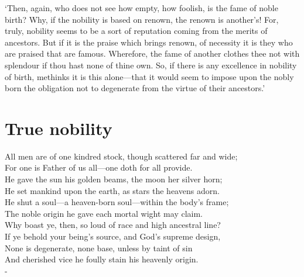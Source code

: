 \documentclass[12pt]{book}
\newenvironment{ipoem}[1]%
  {\setcounter{poemindentevery}{#1}\begin{poem}\small}%
  {\end{poem}\setcounter{poemindentevery}{0}}
\begin{document}
`Then, again, who does not see how empty, how foolish, is the fame of
noble birth? Why, if the nobility is based on renown, the renown is
another's! For, truly, nobility seems to be a sort of reputation coming
from the merits of ancestors. But if it is the praise which brings
renown, of necessity it is they who are praised that are famous.
Wherefore, the fame of another clothes thee not with splendour if thou
hast none of thine own. So, if there is any excellence in nobility of
birth, methinks it is this alone---that it would seem to impose upon the
nobly born the obligation not to degenerate from the virtue of their
ancestors.'




\section{True nobility}

\begin{ipoem}{0}
    All men are of one kindred stock, though scattered far and wide; \\
    For one is Father of us all---one doth for all provide. \\
    He gave the sun his golden beams, the moon her silver horn; \\
    He set mankind upon the earth, as stars the heavens adorn. \\
    He shut a soul---a heaven-born soul---within the body's frame; \\
    The noble origin he gave each mortal wight may claim. \\
    Why boast ye, then, so loud of race and high ancestral line? \\
    If ye behold your being's source, and God's supreme design, \\
    None is degenerate, none base, unless by taint of sin \\
    And cherished vice he foully stain his heavenly origin. \\-
\end{ipoem}
\end{document}
